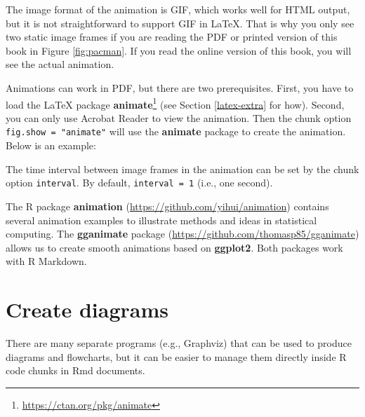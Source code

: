 \documentclass[
  11pt,
]{krantz}
\newenvironment{Shaded}{\begin{snugshade}}{\end{snugshade}}
\newcommand{\BaseNTok}[1]{\textcolor[rgb]{0.06,0.06,0.06}{#1}}
\newcommand{\NormalTok}[1]{#1}
\renewcommand{\href}[2]{#2\footnote{\url{#1}}}
\begin{document}
The image format of the animation is GIF, which works well for HTML output, but it is not straightforward to support GIF in LaTeX. That is why you only see two static image frames if you are reading the PDF or printed version of this book in Figure \ref{fig:pacman}. If you read the online version of this book, you will see the actual animation.

Animations can work in PDF, but there are two prerequisites. First, you have to load the LaTeX package \href{https://ctan.org/pkg/animate}{\textbf{animate}} (see Section \ref{latex-extra} for how). Second, you can only use Acrobat Reader to view the animation. Then the chunk option \texttt{fig.show\ =\ "animate"} will use the \textbf{animate} package to create the animation. Below is an example:

\begin{Shaded}
\end{Shaded}

The time interval between image frames in the animation can be set by the chunk option \texttt{interval}. By default, \texttt{interval\ =\ 1} (i.e., one second).

The R package \textbf{animation} (\url{https://github.com/yihui/animation}) contains several animation examples to illustrate methods and ideas in statistical computing. The \textbf{gganimate} package (\url{https://github.com/thomasp85/gganimate}) allows us to create smooth animations based on \textbf{ggplot2}. Both packages work with R Markdown.

\hypertarget{diagrams}{%
\section{Create diagrams}\label{diagrams}}

There are many separate programs (e.g., Graphviz) that can be used to produce diagrams and flowcharts, but it can be easier to manage them directly inside R code chunks in Rmd documents.
\end{document}
